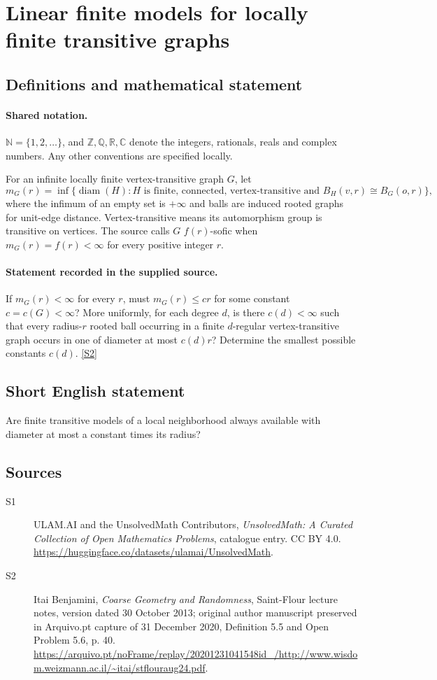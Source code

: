 \documentclass[11pt]{article}
\newcommand{\sref}[2]{\hyperlink{source:#1:#2}{[S#2]}}
\begin{document}
\section{Linear finite models for locally finite transitive graphs}\label{statement}

\subsection{Definitions and mathematical statement}

\paragraph{Shared notation.}$\mathbb N=\{1,2,\ldots\}$, and $\mathbb Z,\mathbb Q,\mathbb R,\mathbb C$ denote the integers, rationals, reals and complex numbers. Any other conventions are specified locally.


For an infinite locally finite vertex-transitive graph $G$, let
\[m_G(r)=\inf\{\operatorname{diam}(H):H\text{ is finite, connected, vertex-transitive and }B_H(v,r)\cong B_G(o,r)\},\]
where the infimum of an empty set is $+\infty$ and balls are induced rooted graphs for unit-edge distance. Vertex-transitive means its automorphism group is transitive on vertices. The source calls $G$ $f(r)$-sofic when $m_G(r)=f(r)<\infty$ for every positive integer $r$.
\paragraph{Statement recorded in the supplied source.}
If $m_G(r)<\infty$ for every $r$, must $m_G(r)\le cr$ for some constant $c=c(G)<\infty$? More uniformly, for each degree $d$, is there $c(d)<\infty$ such that every radius-$r$ rooted ball occurring in a finite $d$-regular vertex-transitive graph occurs in one of diameter at most $c(d)r$? Determine the smallest possible constants $c(d)$. \sref{statement}{2}
\subsection{Short English statement}
Are finite transitive models of a local neighborhood always available with diameter at most a constant times its radius?
\subsection{Sources}
\begin{description}
\item[\hypertarget{source:statement:1}{S1}] ULAM.AI and the UnsolvedMath Contributors, \emph{UnsolvedMath: A Curated Collection of Open Mathematics Problems}, catalogue entry. CC BY 4.0. \url{https://huggingface.co/datasets/ulamai/UnsolvedMath}.
\item[\hypertarget{source:statement:2}{S2}] Itai Benjamini, \emph{Coarse Geometry and Randomness}, Saint-Flour lecture notes, version dated 30 October 2013; original author manuscript preserved in Arquivo.pt capture of 31 December 2020, Definition 5.5 and Open Problem 5.6, p. 40. \url{https://arquivo.pt/noFrame/replay/20201231041548id_/http://www.wisdom.weizmann.ac.il/~itai/stflouraug24.pdf}.
\end{description}
\label{end:statement}
\end{document}
